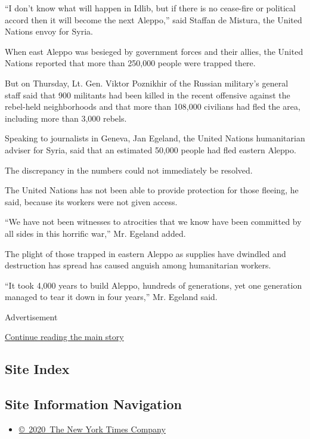 ``I don't know what will happen in Idlib, but if there is no cease-fire
or political accord then it will become the next Aleppo,'' said Staffan
de Mistura, the United Nations envoy for Syria.

When east Aleppo was besieged by government forces and their allies, the
United Nations reported that more than 250,000 people were trapped
there.

But on Thursday, Lt. Gen. Viktor Poznikhir of the Russian military's
general staff said that 900 militants had been killed in the recent
offensive against the rebel-held neighborhoods and that more than
108,000 civilians had fled the area, including more than 3,000 rebels.

Speaking to journalists in Geneva, Jan Egeland, the United Nations
humanitarian adviser for Syria, said that an estimated 50,000 people had
fled eastern Aleppo.

The discrepancy in the numbers could not immediately be resolved.

The United Nations has not been able to provide protection for those
fleeing, he said, because its workers were not given access.

``We have not been witnesses to atrocities that we know have been
committed by all sides in this horrific war,'' Mr. Egeland added.

The plight of those trapped in eastern Aleppo as supplies have dwindled
and destruction has spread has caused anguish among humanitarian
workers.

``It took 4,000 years to build Aleppo, hundreds of generations, yet one
generation managed to tear it down in four years,'' Mr. Egeland said.

Advertisement

\protect\hyperlink{after-bottom}{Continue reading the main story}

\hypertarget{site-index}{%
\subsection{Site Index}\label{site-index}}

\hypertarget{site-information-navigation}{%
\subsection{Site Information
Navigation}\label{site-information-navigation}}

\begin{itemize}
\tightlist
\item
  \href{https://help.nytimes3xbfgragh.onion/hc/en-us/articles/115014792127-Copyright-notice}{©~2020~The
  New York Times Company}
\end{itemize}

